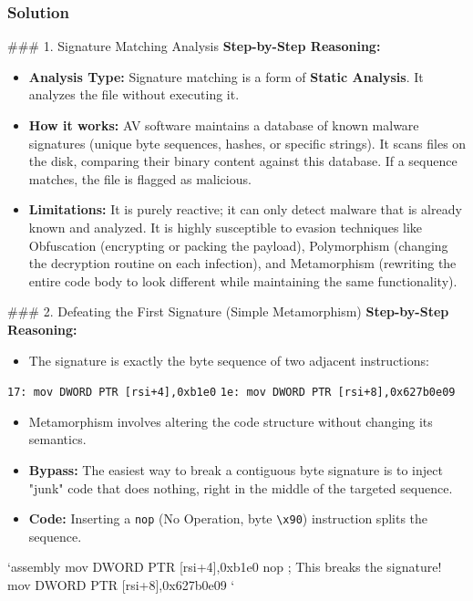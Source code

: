 \documentclass{article}
\begin{document}
\subsubsection*{Solution}
\#\#\# 1. Signature Matching Analysis
\textbf{Step-by-Step Reasoning:}
\begin{itemize}
    \item \textbf{Analysis Type:} Signature matching is a form of \textbf{Static Analysis}. It analyzes the file without executing it.
    \item \textbf{How it works:} AV software maintains a database of known malware signatures (unique byte sequences, hashes, or specific strings). It scans files on the disk, comparing their binary content against this database. If a sequence matches, the file is flagged as malicious.
    \item \textbf{Limitations:} It is purely reactive; it can only detect malware that is already known and analyzed. It is highly susceptible to evasion techniques like Obfuscation (encrypting or packing the payload), Polymorphism (changing the decryption routine on each infection), and Metamorphism (rewriting the entire code body to look different while maintaining the same functionality).

\end{itemize}
\#\#\# 2. Defeating the First Signature (Simple Metamorphism)
\textbf{Step-by-Step Reasoning:}
\begin{itemize}
    \item The signature is exactly the byte sequence of two adjacent instructions:
\end{itemize}
\texttt{17: mov DWORD PTR [rsi+4],0xb1e0}
\texttt{1e: mov DWORD PTR [rsi+8],0x627b0e09}
\begin{itemize}
    \item Metamorphism involves altering the code structure without changing its semantics.
    \item \textbf{Bypass:} The easiest way to break a contiguous byte signature is to inject "junk" code that does nothing, right in the middle of the targeted sequence.
    \item \textbf{Code:} Inserting a \texttt{nop} (No Operation, byte \texttt{\textbackslash{}x90}) instruction splits the sequence.
\end{itemize}
\texttt{}`assembly
mov DWORD PTR [rsi+4],0xb1e0
nop    ; This breaks the signature!
mov DWORD PTR [rsi+8],0x627b0e09
\texttt{}`
\end{document}
